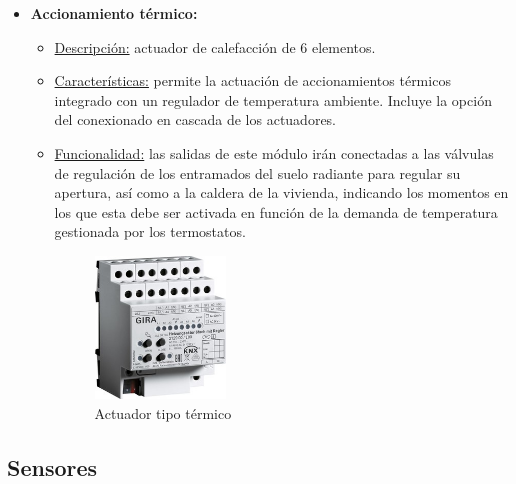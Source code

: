 \begin{itemize}
\item \textbf{Accionamiento térmico:} 
	\begin{itemize}
	\item\underline{Descripción:} actuador de calefacción de 6 elementos.
	\item \underline{Características:} permite la actuación de accionamientos térmicos integrado con un regulador de temperatura ambiente. Incluye la opción del conexionado en cascada de los actuadores.
	\item \underline{Funcionalidad:} las salidas de este módulo irán conectadas a las válvulas de regulación de los entramados del suelo radiante para regular su apertura, así como a la caldera de la vivienda, indicando los momentos en los que esta debe ser activada en función de la demanda de temperatura gestionada por los termostatos. \\ [0,15 cm]
	\begin{figure}[h]
	\centering
	\includegraphics[width=0.35\textwidth]{figures/actuador_termico.jpg}   
	\caption{Actuador tipo térmico}
	\label{fig:actuador_termico}
	\end{figure}
	\end{itemize} 
\end{itemize} 

\subsection{Sensores}

